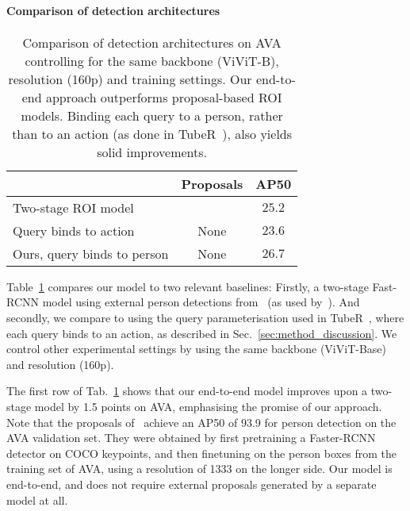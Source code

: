 \documentclass[10pt,twocolumn,letterpaper]{article}
\begin{document}
\paragraph{Comparison of detection architectures}
\begin{table}[t]
\centering
\caption{
    Comparison of detection architectures on AVA controlling for the same backbone (ViViT-B), resolution (160p) and training settings.
    Our end-to-end approach outperforms proposal-based ROI models.
    Binding each query to a person, rather than to an action (as done in TubeR~\cite{zhao2022tuber}), also yields solid improvements.
}
\begin{tabular}{lcc}
    \toprule
                          & Proposals    & AP50 \\ 
    \midrule
    Two-stage ROI model   &  \cite{wu_cvpr_2019}            &   $25.2$   \\ Query binds to action &  None            &   $23.6$  \\  Ours, query binds to person &  None            &   $\mathbf{26.7}$   \\ \bottomrule
\end{tabular}
\label{tab:ablation_detection_architectures}
\vspace{-\baselineskip}
\end{table} 
Table~\ref{tab:ablation_detection_architectures} compares our model to two relevant baselines: Firstly, a two-stage Fast-RCNN model using external person detections from~\cite{wu_cvpr_2019} (as used by~\cite{feichtenhofer_iccv_2019,fan2021multiscale,arnab2022beyond,wu_cvpr_2019}).
And secondly, we compare to using the query parameterisation used in TubeR~\cite{zhao2022tuber}, where each query binds to an action, as described in Sec.~\ref{sec:method_discussion}.
We control other experimental settings by using the same backbone (ViViT-Base) and resolution (160p).

The first row of Tab.~\ref{tab:ablation_detection_architectures} shows that our end-to-end model improves upon a two-stage model by 1.5 points on AVA, emphasising the promise of our approach.
Note that the proposals of~\cite{wu_cvpr_2019} achieve an AP50 of 93.9 for person detection on the AVA validation set.
They were obtained by first pretraining a Faster-RCNN~\cite{ren_neurips_2015} detector on COCO keypoints, and then finetuning on the person boxes from the training set of AVA, using a resolution of 1333 on the longer side.
Our model is end-to-end, and does not require external proposals generated by a separate model at all.
\end{document}

